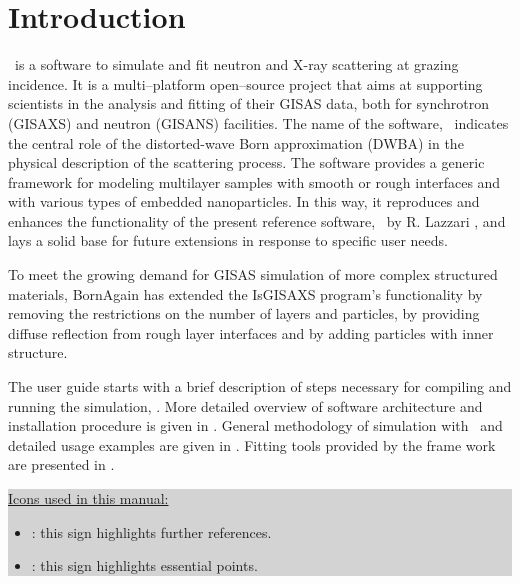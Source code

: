 \newpage
\section{Introduction}

\BornAgain\ is a  software to simulate and fit neutron and X-ray
scattering at grazing incidence. It is a multi–platform open–source project that aims at supporting scientists in the analysis and fitting
of their GISAS data, both for synchrotron (GISAXS) and neutron (GISANS) facilities. The name of the software,
\BornAgain\, indicates the central role of the distorted-wave Born
approximation (DWBA) in the physical description of the
scattering process. The software provides a generic framework for modeling multilayer samples with smooth or
rough interfaces and with various types of embedded nanoparticles. In this way, it reproduces and enhances the
functionality of the present reference software, \IsGISAXS\ by
R. Lazzari \cite{Lazzari:vi0158}, and lays a solid base for future
extensions in response to specific user needs. 

To meet the growing demand for GISAS simulation of more
complex structured materials, BornAgain has extended the IsGISAXS program’s functionality by removing the
restrictions on the number of layers and particles, by providing diffuse reflection from rough layer interfaces and
by adding particles with inner structure.



The user guide starts with a brief description of steps necessary for compiling and running
the simulation, . More detailed overview of software architecture and
installation procedure is given in .
General methodology of simulation with \BornAgain\ and detailed usage examples are given
in .
Fitting tools provided by the frame work are presented in .
\vspace*{2mm}

\colorbox{Lightgray}{\parbox{\linewidth-8\fboxsep}
{\noindent \underline{Icons used in this manual:}
\begin{itemize}
\item[] \smallpencil: this sign highlights further references.
\item[] {\huge\danger}: this sign highlights essential points.
\end{itemize}}}
